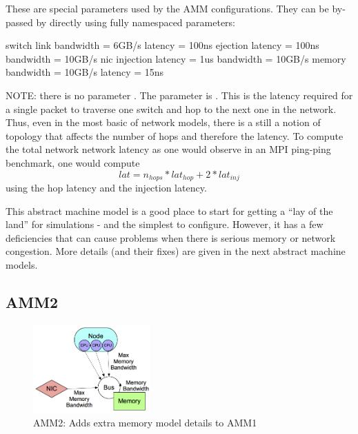 These are special parameters used by the AMM configurations.
They can be by-passed by directly using fully namespaced parameters:

\begin{ViFile}
switch {
 link {
   bandwidth = 6GB/s
   latency = 100ns
 }
 ejection {
  latency = 100ns
  bandwidth = 10GB/s
 }
}
nic {
 injection {
  latency = 1us
  bandwidth = 10GB/s
 }
}
memory {
 bandwidth = 10GB/s
 latency = 15ns
}
\end{ViFile}

NOTE: there is no parameter .
The parameter is .
This is the latency required for a single packet to traverse one switch and hop to the next one in the network.
Thus, even in the most basic of network models, there is a still a notion of topology that affects the number of hops and therefore the latency.
To compute the total network network latency as one would observe in an MPI ping-ping benchmark, one would compute
\[
lat = n_{hops} * lat_{hop} + 2*lat_{inj}
\]
using the hop latency and the injection latency.

This abstract machine model is a good place to start for getting a ``lay of the land'' for simulations - and the simplest to configure.
However, it has a few deficiencies that can cause problems when there is serious memory or network congestion.
More details (and their fixes) are given in the next abstract machine models. 	

\subsection{AMM2}
\label{subsec:amm2}

\begin{figure}
\begin{center}
\includegraphics[width=0.4\textwidth]{figures/amm/amm2_membus.png}
\end{center}
\caption{AMM2: Adds extra memory model details to AMM1}
\label{fig:amm2}
\end{figure}

